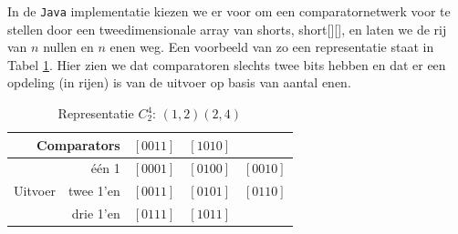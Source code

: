 \documentclass{article}
\begin{document}
In de \texttt{Java} implementatie kiezen we er voor om een comparatornetwerk voor te stellen door een tweedimensionale array van shorts, short[][], en laten we de rij van $n$ nullen en $n$ enen  weg.
Een voorbeeld van zo een representatie staat in Tabel \ref{tabel2}.
Hier zien we dat comparatoren slechts twee bits hebben en dat er een opdeling (in rijen) is van de uitvoer op basis van aantal enen.
\begin{table}[!h]
	\centering
	\begin{tabular}{rr|ccc}
	\multicolumn{2}{r|}{Comparators} & $\left[0011\right]$ & $\left[1010\right]$ & \\ 
	\hline 
	& \'e\'en 1& $\left[0001\right]$ & $\left[0100\right]$ & $\left[0010\right]$ \\ 
	\cline{2-5}
	Uitvoer & twee 1'en &$\left[0011\right]$ & $\left[0101\right]$ & $\left[0110\right]$\\ 
	\cline{2-5}
	&drie 1'en & $\left[0111\right]$ & $\left[1011\right]$ &  \\ 
	\end{tabular}
	\caption{Representatie $C^4_2$: $(1,2)(2,4)$}
	\label{tabel2}
\end{table}
\end{document}
